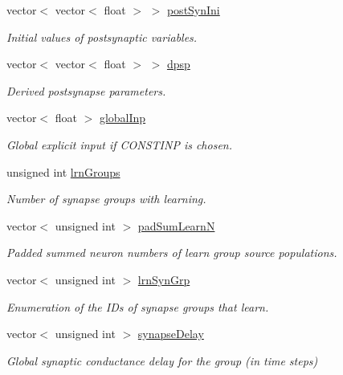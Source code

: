 \begin{DoxyCompactItemize}
vector$<$ vector$<$ float $>$ $>$ \hyperlink{classNNmodel_a82827284185d5c39e4e04e14cf612253}{post\+Syn\+Ini}
\begin{DoxyCompactList}\small\item\em Initial values of postsynaptic variables. \end{DoxyCompactList}\item 
vector$<$ vector$<$ float $>$ $>$ \hyperlink{classNNmodel_aa03452826c44c9af81eba7a618de7e09}{dpsp}
\begin{DoxyCompactList}\small\item\em Derived postsynapse parameters. \end{DoxyCompactList}\item 
vector$<$ float $>$ \hyperlink{classNNmodel_a8df5fd36faa5a56edea7d287fea1f625}{global\+Inp}
\begin{DoxyCompactList}\small\item\em Global explicit input if C\+O\+N\+S\+T\+I\+N\+P is chosen. \end{DoxyCompactList}\item 
unsigned int \hyperlink{classNNmodel_aa0e25f384103db3bcc8c8b0425ae01b3}{lrn\+Groups}
\begin{DoxyCompactList}\small\item\em Number of synapse groups with learning. \end{DoxyCompactList}\item 
vector$<$ unsigned int $>$ \hyperlink{classNNmodel_a2e6021bca44ea5ec0478e99cc6249295}{pad\+Sum\+Learn\+N}
\begin{DoxyCompactList}\small\item\em Padded summed neuron numbers of learn group source populations. \end{DoxyCompactList}\item 
vector$<$ unsigned int $>$ \hyperlink{classNNmodel_acbc44c117c06cf73ab36068eb701e240}{lrn\+Syn\+Grp}
\begin{DoxyCompactList}\small\item\em Enumeration of the I\+Ds of synapse groups that learn. \end{DoxyCompactList}\item 
vector$<$ unsigned int $>$ \hyperlink{classNNmodel_a3c7efe131920a17f9292c0d2ffd74d7c}{synapse\+Delay}
\begin{DoxyCompactList}\small\item\em Global synaptic conductance delay for the group (in time steps) \end{DoxyCompactList}\item 

\end{DoxyCompactItemize}
